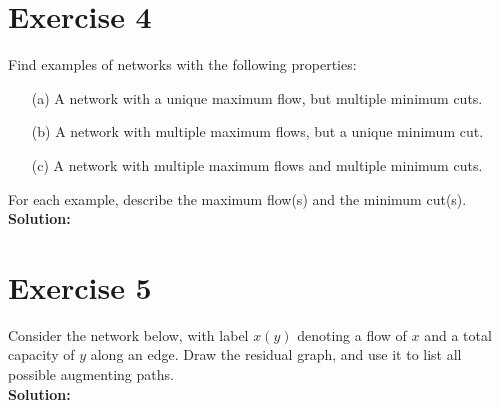 \documentclass{article}
\begin{document}
\newpage

\section*{Exercise 4}
Find examples of networks with the following properties:

\begin{itemize}
    \item[(a)] A network with a unique maximum flow, but multiple minimum cuts.
    \item[(b)] A network with multiple maximum flows, but a unique minimum cut.
    \item[(c)] A network with multiple maximum flows and multiple minimum cuts.
\end{itemize}

For each example, describe the maximum flow(s) and the minimum cut(s). \\

\textbf{Solution:} \\



\newpage

\section*{Exercise 5}
Consider the network below, with label $x(y)$ denoting a flow of $x$ and a total capacity of $y$ along an edge. Draw the residual graph, and use it to list all possible augmenting paths. \\

\textbf{Solution:} \\
\end{document}

